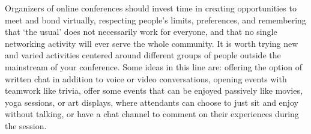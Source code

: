 \documentclass[10pt,letterpaper]{article}
\begin{document}
Organizers of online conferences should invest time in creating opportunities to meet and bond virtually, respecting people's limits, preferences, and remembering that `the usual' does not necessarily work for everyone, and that no single networking activity will ever serve the whole community. 
It is worth trying new and varied activities centered around different groups of people outside the mainstream of your conference.
Some ideas in this line are: offering the option of written chat in addition to voice or video conversations, opening events with teamwork like trivia, offer some events that can be enjoyed passively like movies, yoga sessions, or art displays, where attendants can choose to just sit and enjoy without talking, or have a chat channel to comment on their experiences during the session. 
\end{document}
